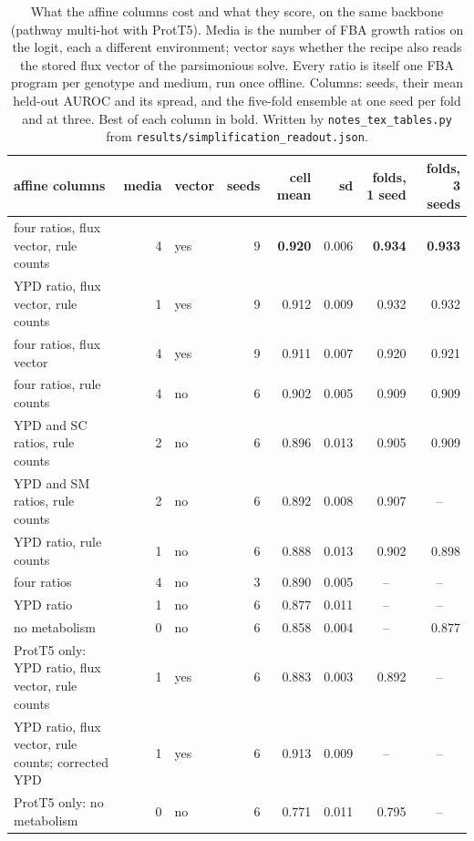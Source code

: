 \begin{table}[H]
  \centering
  \footnotesize
  \caption[Rounds 83 to 98: media and flux vector on the released split]{What the affine columns cost and what they score, on the same backbone (pathway multi-hot with ProtT5). Media is the number of FBA growth ratios on the logit, each a different environment; vector says whether the recipe also reads the stored flux vector of the parsimonious solve. Every ratio is itself one FBA program per genotype and medium, run once offline. Columns: seeds, their mean held-out AUROC and its spread, and the five-fold ensemble at one seed per fold and at three. Best of each column in bold. Written by \texttt{notes\_tex\_tables.py} from \texttt{results/simplification\_readout.json}.}
  \label{tab:simplification-ladder}
  \begin{tabular}{@{}lrlrrrrr@{}}
    \hline
    affine columns & media & vector & seeds & cell mean & sd & folds, 1 seed & folds, 3 seeds \\
    \hline
    four ratios, flux vector, rule counts & 4 & yes & 9 & \textbf{0.920} & 0.006 & \textbf{0.934} & \textbf{0.933} \\
    YPD ratio, flux vector, rule counts & 1 & yes & 9 & 0.912 & 0.009 & 0.932 & 0.932 \\
    four ratios, flux vector & 4 & yes & 9 & 0.911 & 0.007 & 0.920 & 0.921 \\
    four ratios, rule counts & 4 & no & 6 & 0.902 & 0.005 & 0.909 & 0.909 \\
    YPD and SC ratios, rule counts & 2 & no & 6 & 0.896 & 0.013 & 0.905 & 0.909 \\
    YPD and SM ratios, rule counts & 2 & no & 6 & 0.892 & 0.008 & 0.907 & \multicolumn{1}{c}{--} \\
    YPD ratio, rule counts & 1 & no & 6 & 0.888 & 0.013 & 0.902 & 0.898 \\
    four ratios & 4 & no & 3 & 0.890 & 0.005 & \multicolumn{1}{c}{--} & \multicolumn{1}{c}{--} \\
    YPD ratio & 1 & no & 6 & 0.877 & 0.011 & \multicolumn{1}{c}{--} & \multicolumn{1}{c}{--} \\
    no metabolism & 0 & no & 6 & 0.858 & 0.004 & \multicolumn{1}{c}{--} & 0.877 \\
    ProtT5 only: YPD ratio, flux vector, rule counts & 1 & yes & 6 & 0.883 & 0.003 & 0.892 & \multicolumn{1}{c}{--} \\
    YPD ratio, flux vector, rule counts; corrected YPD & 1 & yes & 6 & 0.913 & 0.009 & \multicolumn{1}{c}{--} & \multicolumn{1}{c}{--} \\
    ProtT5 only: no metabolism & 0 & no & 6 & 0.771 & 0.011 & 0.795 & \multicolumn{1}{c}{--} \\
    \hline
  \end{tabular}
\end{table}
